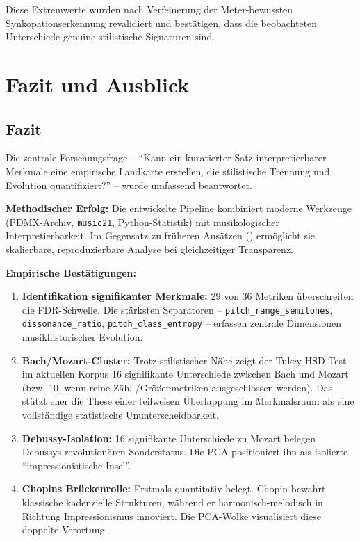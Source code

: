 \documentclass[12pt,a4paper]{article}
\theoremstyle{definition}
\begin{document}
Diese Extremwerte wurden nach Verfeinerung der Meter-bewussten Synkopationserkennung revalidiert und bestätigen, dass die beobachteten Unterschiede genuine stilistische Signaturen sind.

\section{Fazit und Ausblick}
\subsection{Fazit}
Die zentrale Forschungsfrage -- \enquote{Kann ein kuratierter Satz interpretierbarer Merkmale eine empirische Landkarte erstellen, die stilistische Trennung und Evolution quantifiziert?} -- wurde umfassend beantwortet.

\textbf{Methodischer Erfolg:} Die entwickelte Pipeline kombiniert moderne Werkzeuge (PDMX-Archiv, \texttt{music21}, Python-Statistik) mit musikologischer Interpretierbarkeit. Im Gegensatz zu früheren Ansätzen (\cite{LinJeng1987}) ermöglicht sie skalierbare, reproduzierbare Analyse bei gleichzeitiger Transparenz.

\textbf{Empirische Bestätigungen:}
\begin{enumerate}
    \item \textbf{Identifikation signifikanter Merkmale:} 29 von 36 Metriken überschreiten die FDR-Schwelle. Die stärksten Separatoren -- \texttt{pitch\_range\_semitones}, \texttt{dissonance\_ratio}, \texttt{pitch\_class\_entropy} -- erfassen zentrale Dimensionen musikhistorischer Evolution.
    
    \item \textbf{Bach/Mozart-Cluster:} Trotz stilistischer Nähe zeigt der Tukey-HSD-Test im aktuellen Korpus 16 signifikante Unterschiede zwischen Bach und Mozart (bzw. 10, wenn reine Zähl-/Größenmetriken ausgeschlossen werden). Das stützt eher die These einer teilweisen Überlappung im Merkmalsraum als eine vollständige statistische Ununterscheidbarkeit.
    
    \item \textbf{Debussy-Isolation:} 16 signifikante Unterschiede zu Mozart belegen Debussys revolutionären Sonderstatus. Die PCA positioniert ihn als isolierte \enquote{impressionistische Insel}.
    
    \item \textbf{Chopins Brückenrolle:} Erstmals quantitativ belegt. Chopin bewahrt klassische kadenzielle Strukturen, während er harmonisch-melodisch in Richtung Impressionismus innoviert. Die PCA-Wolke visualisiert diese doppelte Verortung.
\end{enumerate}
\end{document}
